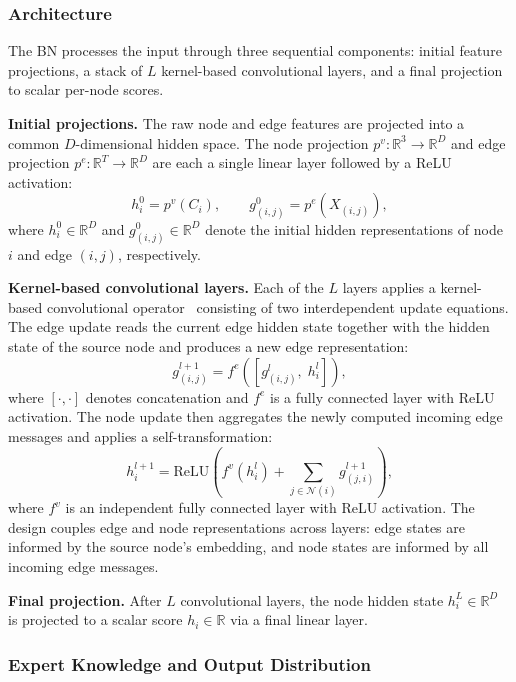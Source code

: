 \subsubsection{Architecture}
\label{sssec:bn-architecture}

The BN processes the input through three sequential components: initial feature projections, a stack of $L$ kernel-based convolutional layers, and a final projection to scalar per-node scores.

\textbf{Initial projections.} The raw node and edge features are projected into a common $D$-dimensional hidden space. The node projection $p^v : \mathbb{R}^3 \rightarrow \mathbb{R}^D$ and edge projection $p^e : \mathbb{R}^T \rightarrow \mathbb{R}^D$ are each a single linear layer followed by a ReLU activation:
\[
    h^0_i = p^v(C_i), \qquad g^0_{(i,j)} = p^e\!\left(X_{(i,j)}\right),
\]
where $h^0_i \in \mathbb{R}^D$ and $g^0_{(i,j)} \in \mathbb{R}^D$ denote the initial hidden representations of node $i$ and edge $(i,j)$, respectively.

\textbf{Kernel-based convolutional layers.} Each of the $L$ layers applies a kernel-based convolutional operator~\cite{Gilmer2017,Simonovsky2017} consisting of two interdependent update equations. The edge update reads the current edge hidden state together with the hidden state of the source node and produces a new edge representation:
\[
    g^{l+1}_{(i,j)} = f^e\!\left(\left[g^l_{(i,j)},\; h^l_i\right]\right),
\]
where $[\cdot, \cdot]$ denotes concatenation and $f^e$ is a fully connected layer with ReLU activation. The node update then aggregates the newly computed incoming edge messages and applies a self-transformation:
\[
    h^{l+1}_i = \mathrm{ReLU}\!\left(f^v\!\left(h^l_i\right) + \sum_{j \in \mathcal{N}(i)} g^{l+1}_{(j,i)}\right),
\]
where $f^v$ is an independent fully connected layer with ReLU activation. The design couples edge and node representations across layers: edge states are informed by the source node's embedding, and node states are informed by all incoming edge messages.

\textbf{Final projection.} After $L$ convolutional layers, the node hidden state $h^L_i \in \mathbb{R}^D$ is projected to a scalar score $h_i \in \mathbb{R}$ via a final linear layer.

\subsubsection{Expert Knowledge and Output Distribution}
\label{sssec:bn-expert}


